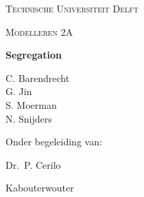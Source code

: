 \documentclass{report}
\begin{document}
\begin{titlepage}


	\centering
	{\scshape\Large Technische Universiteit Delft\par}
	\vspace{1cm}
	{\scshape\Large Modelleren 2A\par}
	\vspace{1.5cm}
	{\Huge\bfseries Segregation\par}
	\vspace{2cm}
	{\Large
	C. Barendrecht\\ 
	G. Jin\\
	S. Moerman\\
	N. Snijders\par}
	\vfill
	Onder begeleiding van:\par
	Dr.~P. Cerilo

	\vfill
\end{titlepage}
\ClearWallPaper
Kabouterwouter
\end{document}
